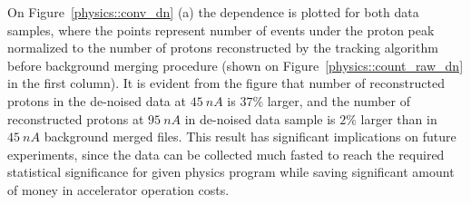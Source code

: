 
On Figure~\ref{physics::conv_dn} (a) the dependence is plotted for both data samples, where the points represent number of events under the proton peak normalized to the number of protons reconstructed by the tracking algorithm before background merging procedure (shown on Figure~\ref{physics::count_raw_dn} in the first column).
It is evident from the figure that number of reconstructed protons in the de-noised data at $45~nA$ is $37\%$ larger, and the number of reconstructed protons at $95~nA$ in de-noised data sample is $2\%$ larger than in $45~nA$ background merged files. This result has significant implications on future experiments, since the data can be collected much fasted to reach the required statistical significance for given physics program while saving significant amount of money in accelerator operation costs.




